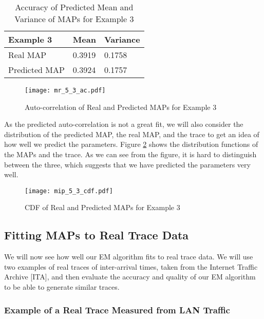 \documentclass[a4paper,11pt,titlepage]{article}
\begin{document}
\begin{table}[h!]
\begin{center}
\begin{tabular}{|l|l|l|}
\hline
Example 3 & Mean & Variance \\ \hline
Real MAP & 0.3919 & 0.1758 \\ \hline
Predicted MAP & 0.3924 & 0.1757 \\ \hline
\end{tabular}
\caption{Accuracy of Predicted Mean and Variance of MAPs for Example 3}
\label{table:ex3_mean_var}
\end{center}
\end{table}

\begin{figure}[h!]
\begin{center}
\texttt{[image: mr\_5\_3\_ac.pdf]}
\caption{Auto-correlation of Real and Predicted MAPs for Example 3}
\label{fig:mr_5_3_ac}
\end{center}
\end{figure}

As the predicted auto-correlation is not a great fit, we will also consider the distribution of the predicted MAP, the real MAP, and the trace to get an idea of how well we predict the parameters. Figure \ref{fig:mr_5_3_cdf} shows the distribution functions of the MAPs and the trace. As we can see from the figure, it is hard to distinguish between the three, which suggests that we have predicted the parameters very well. 

\begin{figure}[h!]
\begin{center}
\texttt{[image: mip\_5\_3\_cdf.pdf]}
\caption{CDF of Real and Predicted MAPs for Example 3}
\label{fig:mr_5_3_cdf}
\end{center}
\end{figure}

\subsection{Fitting MAPs to Real Trace Data}

We will now see how well our EM algorithm fits to real trace data. We will use two examples of real traces of inter-arrival times, taken from the Internet Traffic Archive [ITA], and then evaluate the accuracy and quality of our EM algorithm to be able to generate similar traces. 

\subsubsection{Example of a Real Trace Measured from LAN Traffic}
\end{document}
